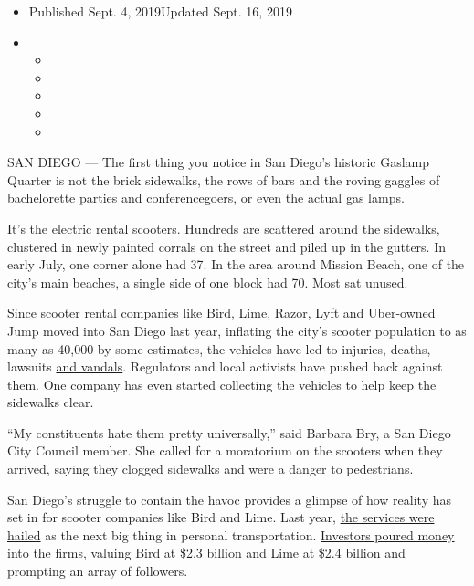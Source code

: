 \begin{itemize}
\item
  Published Sept. 4, 2019Updated Sept. 16, 2019
\item
  \begin{itemize}
  \item
  \item
  \item
  \item
  \item
  \end{itemize}
\end{itemize}

SAN DIEGO --- The first thing you notice in San Diego's historic Gaslamp
Quarter is not the brick sidewalks, the rows of bars and the roving
gaggles of bachelorette parties and conferencegoers, or even the actual
gas lamps.

It's the electric rental scooters. Hundreds are scattered around the
sidewalks, clustered in newly painted corrals on the street and piled up
in the gutters. In early July, one corner alone had 37. In the area
around Mission Beach, one of the city's main beaches, a single side of
one block had 70. Most sat unused.

Since scooter rental companies like Bird, Lime, Razor, Lyft and
Uber-owned Jump moved into San Diego last year, inflating the city's
scooter population to as many as 40,000 by some estimates, the vehicles
have led to injuries, deaths, lawsuits
\href{https://fox5sandiego.com/2019/06/17/dozens-of-electric-scooters-bikes-found-defaced-or-damaged-in-ocean-beach/}{and
vandals}. Regulators and local activists have pushed back against them.
One company has even started collecting the vehicles to help keep the
sidewalks clear.

``My constituents hate them pretty universally,'' said Barbara Bry, a
San Diego City Council member. She called for a moratorium on the
scooters when they arrived, saying they clogged sidewalks and were a
danger to pedestrians.

San Diego's struggle to contain the havoc provides a glimpse of how
reality has set in for scooter companies like Bird and Lime. Last year,
\href{https://www.nytimes3xbfgragh.onion/2018/06/06/technology/how-i-learned-to-stop-worrying-and-love-electric-scooters.html}{the
services were hailed} as the next big thing in personal transportation.
\href{https://www.nytimes3xbfgragh.onion/2018/06/12/technology/bird-electric-scooter-investment.html}{Investors
poured money} into the firms, valuing Bird at \$2.3 billion and Lime at
\$2.4 billion and prompting an array of followers.


